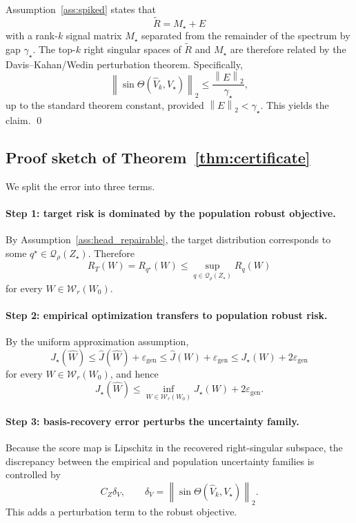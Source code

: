 \documentclass{article}
\newcommand{\cQ}{\mathcal{Q}}
\newcommand{\cW}{\mathcal{W}}
\newcommand{\1}{\mathbbm{1}}
\newcommand{\norm}[1]{\left\lVert #1 \right\rVert}
\begin{document}
Assumption~\ref{ass:spiked} states that
\[
    \widetilde R = M_\star + E
\]
with a rank-\(k\) signal matrix \(M_\star\) separated from the remainder of the spectrum by gap \(\gamma_\star\). The top-\(k\) right singular spaces of \(\widetilde R\) and \(M_\star\) are therefore related by the Davis--Kahan/Wedin perturbation theorem. Specifically,
\[
    \norm{\sin \Theta(\widehat V_k, V_\star)}_2
    \le
    \frac{\norm{E}_2}{\gamma_\star},
\]
up to the standard theorem constant, provided \(\norm{E}_2 < \gamma_\star\). This yields the claim.
\qed

\subsection{Proof sketch of Theorem~\ref{thm:certificate}}

We split the error into three terms.

\paragraph{Step 1: target risk is dominated by the population robust objective.}
By Assumption~\ref{ass:head_repairable}, the target distribution corresponds to some \(q^\star \in \cQ_\rho(Z_\star)\). Therefore
\[
    R_T(W)
    =
    R_{q^\star}(W)
    \le
    \sup_{q\in\cQ_\rho(Z_\star)} R_q(W)
\]
for every \(W\in\cW_r(W_0)\).

\paragraph{Step 2: empirical optimization transfers to population robust risk.}
By the uniform approximation assumption,
\[
    J_\star(\widehat W)
    \le
    \widehat J(\widehat W) + \varepsilon_{\mathrm{gen}}
    \le
    \widehat J(W) + \varepsilon_{\mathrm{gen}}
    \le
    J_\star(W) + 2\varepsilon_{\mathrm{gen}}
\]
for every \(W\in\cW_r(W_0)\), and hence
\[
    J_\star(\widehat W)
    \le
    \inf_{W\in\cW_r(W_0)} J_\star(W) + 2\varepsilon_{\mathrm{gen}}.
\]

\paragraph{Step 3: basis-recovery error perturbs the uncertainty family.}
Because the score map is Lipschitz in the recovered right-singular subspace, the discrepancy between the empirical and population uncertainty families is controlled by
\[
    C_Z \delta_V,
    \qquad
    \delta_V = \norm{\sin \Theta(\widehat V_k, V_\star)}_2.
\]
This adds a perturbation term to the robust objective.
\end{document}

